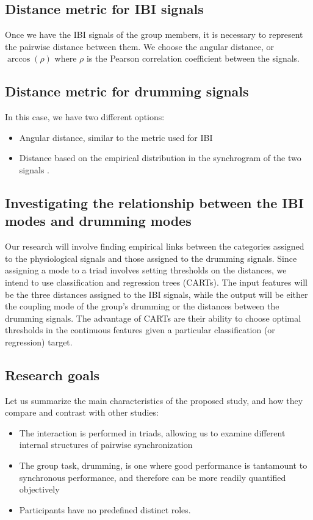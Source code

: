 \documentclass[a4paper, 11pt]{report}      %
\begin{document}
\subsection{Distance metric for IBI signals}
Once we have the IBI signals of the group members, it is necessary to represent the pairwise distance between them. We choose the angular distance, or $\arccos(\rho)$ where $\rho$ is the Pearson correlation coefficient between the signals.

\subsection{Distance metric for drumming signals}
In this case, we have two different options:
\begin{itemize}
    \item Angular distance, similar to the metric used for IBI
    \item Distance based on the empirical distribution in the synchrogram of the two signals \citep{schafer1998heartbeat}.
\end{itemize}

\subsection{Investigating the relationship between the IBI modes and drumming modes}

Our research will involve finding empirical links between the categories assigned to the physiological signals and those assigned to the drumming signals. Since assigning a mode to a triad involves setting thresholds on the distances, we intend to use classification and regression trees (CARTs). The input features will be the three distances assigned to the IBI signals, while the output will be either the coupling mode of the group's drumming or the distances between the drumming signals. The advantage of CARTs are their ability to choose optimal thresholds in the continuous features given a particular classification (or regression) target.



\subsection{Research goals}

Let us summarize the main characteristics of the proposed study, and how they compare and contrast with other studies:
\begin{itemize}
    \item The interaction is performed in triads, allowing us to examine different internal structures of pairwise synchronization
    \item The group task, drumming, is one where good performance is tantamount to synchronous performance, and therefore can be more readily quantified objectively
    \item Participants have no predefined distinct roles.
\end{itemize}
\end{document}
